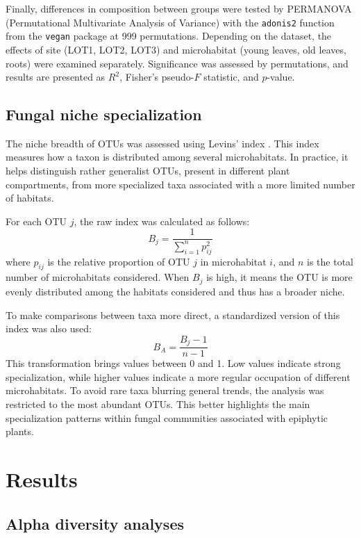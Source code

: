 \documentclass[alpha-refs,twocolumn]{wiley-article}
\begin{document}
Finally, differences in composition between groups were tested by PERMANOVA (Permutational Multivariate Analysis of Variance) with the \texttt{adonis2} function from the \texttt{vegan} package \citep{anderson2001new} at 999 permutations. Depending on the dataset, the effects of site (LOT1, LOT2, LOT3) and microhabitat (young leaves, old leaves, roots) were examined separately. Significance was assessed by permutations, and results are presented as \(R^2\), Fisher's pseudo-\(F\) statistic, and \(p\)-value.

\subsection{Fungal niche specialization}

The niche breadth of OTUs was assessed using Levins' index \citep{levins1968evolution}. This index measures how a taxon is distributed among several microhabitats. In practice, it helps distinguish rather generalist OTUs, present in different plant compartments, from more specialized taxa associated with a more limited number of habitats.

For each OTU \(j\), the raw index was calculated as follows:
\[ B_j = \frac{1}{\sum_{i=1}^{n} p_{ij}^{2}} \]
where \(p_{ij}\) is the relative proportion of OTU \(j\) in microhabitat \(i\), and \(n\) is the total number of microhabitats considered. When \(B_j\) is high, it means the OTU is more evenly distributed among the habitats considered and thus has a broader niche.

To make comparisons between taxa more direct, a standardized version of this index was also used:
\[ B_{A} = \frac{B_j - 1}{n - 1} \]
This transformation brings values between 0 and 1. Low values indicate strong specialization, while higher values indicate a more regular occupation of different microhabitats. To avoid rare taxa blurring general trends, the analysis was restricted to the most abundant OTUs. This better highlights the main specialization patterns within fungal communities associated with epiphytic plants.

\section{Results}

\subsection{Alpha diversity analyses}
\end{document}
